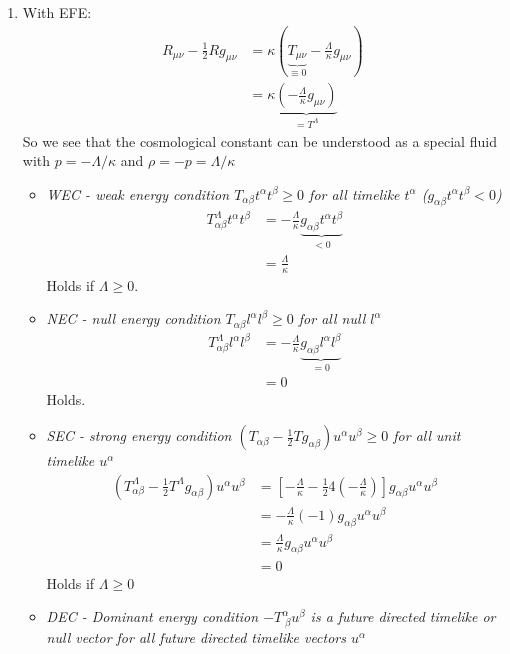 \documentclass[10pt,a4paper]{article}
\theoremstyle{definition}
\begin{document}
\begin{enumerate}
\item With EFE:
\begin{align}
R_{\mu\nu}-\frac{1}{2}Rg_{\mu\nu}&=\kappa\left(\underbrace{T_{\mu\nu}}_{\equiv0}-\frac{\Lambda}{\kappa} g_{\mu\nu}\right)\\
&=\kappa\underbrace{\left(-\frac{\Lambda}{\kappa} g_{\mu\nu}\right)}_{=T^\Lambda}
\end{align}
So we see that the cosmological constant can be understood as a special fluid with $p=-\Lambda/\kappa$ and $\rho=-p=\Lambda/\kappa$ 

\begin{itemize}
\item {\it WEC - weak energy condition $T_{\alpha\beta}t^\alpha t^\beta\ge0$ for all timelike $t^\alpha$ ($g_{\alpha\beta}t^\alpha t^\beta<0$)}
\begin{align}
T^\Lambda_{\alpha\beta}t^\alpha t^\beta
&=-\frac{\Lambda}{\kappa}\underbrace{g_{\alpha\beta}t^\alpha t^\beta}_{<0}\\
&=\frac{\Lambda}{\kappa}
\end{align}
Holds if $\Lambda\ge0$.
\item {\it NEC - null energy condition $T_{\alpha\beta}l^\alpha l^\beta\ge0$ for all null $l^\alpha$}
\begin{align}
T^\Lambda_{\alpha\beta}l^\alpha l^\beta
&=-\frac{\Lambda}{\kappa}\underbrace{g_{\alpha\beta}l^\alpha l^\beta}_{=0}\\
&=0
\end{align}
Holds.
\item {\it SEC - strong energy condition $(T_{\alpha\beta}-\frac{1}{2}Tg_{\alpha\beta})u^\alpha u^\beta\ge0$ for all unit timelike $u^\alpha$}
\begin{align}
(T^\Lambda_{\alpha\beta}-\frac{1}{2}T^\Lambda g_{\alpha\beta})u^\alpha u^\beta
&=\left[-\frac{\Lambda}{\kappa}-\frac{1}{2}4(-\frac{\Lambda}{\kappa}) \right]g_{\alpha\beta}u^\alpha u^\beta\\
&=-\frac{\Lambda}{\kappa}(-1)g_{\alpha\beta}u^\alpha u^\beta\\
&=\frac{\Lambda}{\kappa}g_{\alpha\beta}u^\alpha u^\beta\\
&=0
\end{align}
Holds if $\Lambda\ge0$

\item {\it DEC - Dominant energy condition $-T^\alpha_{\;\beta}u^\beta$ is a future directed timelike or null vector for all future directed timelike vectors $u^\alpha$}


\end{itemize}
\end{enumerate}
\end{document}
